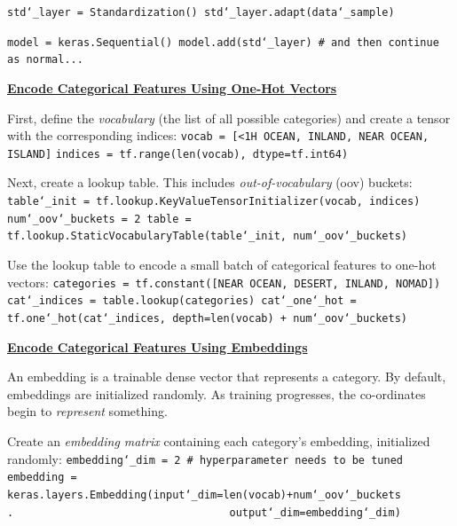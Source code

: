 \texttt{std\char`_layer = Standardization()\newline
std\char`_layer.adapt(data\char`_sample)}

\texttt{model = keras.Sequential()\newline
model.add(std\char`_layer) \# and then continue as normal...}

\textbf{\underline{Encode Categorical Features Using One-Hot Vectors}}

First, define the \textit{vocabulary} (the list of all possible categories)\newline
and create a tensor with the corresponding indices:\newline
\texttt{vocab = [\textquotesingle <1H OCEAN\textquotesingle, \textquotesingle INLAND\textquotesingle, \textquotesingle NEAR OCEAN\textquotesingle, \textquotesingle ISLAND\textquotesingle]}\newline
\texttt{indices = tf.range(len(vocab), dtype=tf.int64)}

Next, create a lookup table.
This includes \textit{out-of-vocabulary} (oov) buckets:\newline
\texttt{table\char`_init = tf.lookup.KeyValueTensorInitializer(vocab, indices)\newline
num\char`_oov\char`_buckets = 2\newline
table = tf.lookup.StaticVocabularyTable(table\char`_init, num\char`_oov\char`_buckets)}

Use the lookup table to encode a small batch of categorical features to one-hot vectors:\newline
\texttt{categories = tf.constant([\textquotesingle NEAR OCEAN\textquotesingle, \textquotesingle DESERT\textquotesingle, \textquotesingle INLAND\textquotesingle, \textquotesingle NOMAD\textquotesingle])\newline
cat\char`_indices = table.lookup(categories)\newline
cat\char`_one\char`_hot = tf.one\char`_hot(cat\char`_indices, depth=len(vocab) + num\char`_oov\char`_buckets)}

\textbf{\underline{Encode Categorical Features Using Embeddings}}

An embedding is a trainable dense vector that represents a category.
By default, embeddings are initialized randomly.
As training progresses, the co-ordinates begin to \textit{represent} something.

Create an \textit{embedding matrix} containing each category's embedding, initialized randomly:\newline
\texttt{embedding\char`_dim = 2 \# hyperparameter needs to be tuned\newline
embedding = keras.layers.Embedding(input\char`_dim=len(vocab)+num\char`_oov\char`_buckets\newline
.~~~~~~~~~~~~~~~~~~~~~~~~~~~~~~~~~~output\char`_dim=embedding\char`_dim)}

